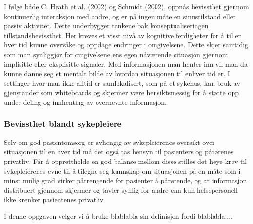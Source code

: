 \noindent
I følge både C. Heath et al. (2002) og Schmidt (2002), oppnås bevissthet gjennom kontinuerlig interaksjon med andre, og er på ingen måte en sinnstilstand eller passiv aktivitet. Dette underbygger tankene bak konseptualiseringen tillstandsbevissthet. Her kreves et visst nivå av kognitive ferdigheter for å til en hver tid kunne overvåke og oppdage endringer i omgivelsene. Dette skjer samtidig som man synliggjør for omgivelsene ens egen nåværende situasjon gjennom implisitte eller eksplisitte signaler. Med informasjonen man henter inn vil man da kunne danne seg et mentalt bilde av hvordan situasjonen til enhver tid er. I settinger hvor man ikke alltid er samlokalisert, som på et sykehus, kan bruk av gjenstander som whiteboards og skjermer være hensiktsmessig for å støtte opp under deling og innhenting av overnevnte informasjon\cite{Bardram04}. 

\subsubsection{Bevissthet blandt sykepleiere}
Selv om god pasientomsorg er avhengig av sykepleierenes oversikt over situasjonen til en hver tid må det også tas hensyn til pasienters og pårørenes privatliv. Får å opprettholde en god balanse mellom disse stilles det høye krav til sykepleierenes evne til å tilegne seg kunnskap om situasjonen på en måte som i minst mulig grad virker påtrengende for pasienter å pårørende, og at informasjon distribuert gjennom skjermer og tavler synlig for andre enn kun helsepersonell ikke krenker pasientenes privatliv\cite{Ebright10}

\noindent
I denne oppgaven velger vi å bruke blablabla sin definisjon fordi blablabla....
